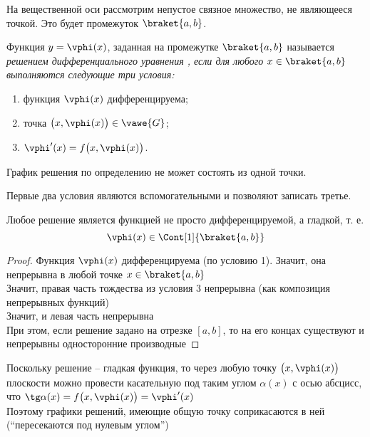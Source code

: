 На вещественной оси рассмотрим непустое связное множество, не являющееся точкой. Это будет промежуток $ \braket{a, b} $.

\begin{definition}
    Функция $ y = \vphi(x) $, заданная на промежутке $ \braket{a, b} $ называется \it{решением дифференциального уравнения} , если для любого $ x \in \braket{a, b} $ выполняются следующие три условия:
    \begin{enumerate}
        \item функция $ \vphi(x) $ дифференцируема;
        \item точка $ \big( x, \vphi(x) \big) \in \vawe{G} $;
        \item $ \vphi'(x) = f\big( x, \vphi(x) \big) $.
    \end{enumerate}
\end{definition}

\begin{remark}
	График решения по определению не может состоять из одной точки.
\end{remark}

\begin{remark}
	Первые два условия являются вспомогательными и позволяют записать третье.
\end{remark}

\begin{remark}
    Любое решение является функцией не просто дифференцируемой, а гладкой, т. е.
    $$ \vphi(x) \in \Cont[1]{\braket{a, b}} $$
\end{remark}

\begin{proof}
    Функция $ \vphi(x) $ дифференцируема (по условию 1). Значит, она непрерывна в любой точке $ x \in \braket{a, b} $ \\
    Значит, правая часть тождества из условия 3 непрерывна (как композиция непрерывных функций) \\
    Значит, и левая часть непрерывна \\
    При этом, если решение задано на отрезке $ [a, b] $, то на его концах существуют и непрерывны односторонние производные
\end{proof}

\begin{remark}
	Поскольку решение -- гладкая функция, то через любую точку $ \big( x, \vphi(x) \big) $ плоскости можно провести касательную под таким углом $ \alpha(x) $ с осью абсцисс, что $ \tg \alpha(x) = f \big(x, \vphi(x) \big) = \vphi'(x) $ \\
    Поэтому графики решений, имеющие общую точку соприкасаются в ней (``пересекаются под нулевым углом'')
\end{remark}

